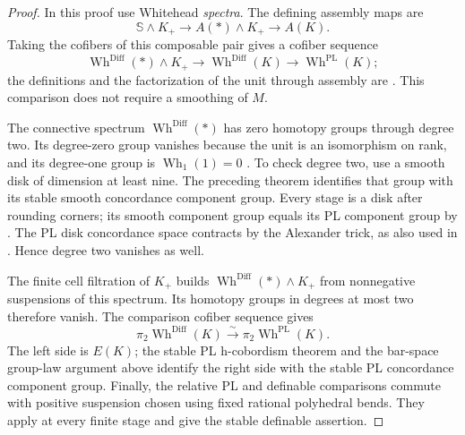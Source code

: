 \begin{proof}
In this proof use Whitehead \emph{spectra}.  The defining assembly
maps are
\[
 \mathbb S\wedge K_+\longrightarrow A(*)\wedge K_+
                \longrightarrow A(K).
\]
Taking the cofibers of this composable pair gives a cofiber sequence
\[
 \operatorname{Wh}^{\mathrm{Diff}}(*)\wedge K_+
 \longrightarrow\operatorname{Wh}^{\mathrm{Diff}}(K)
 \longrightarrow\operatorname{Wh}^{\mathrm{PL}}(K);
\]
the definitions and the factorization of the unit through assembly
are \cite[Definitions~1.3.2 and~1.3.4, pp.~16--18]
{WaldhausenJahrenRognes2013}.  This comparison does not require a
smoothing of $M$.

The connective spectrum $\operatorname{Wh}^{\mathrm{Diff}}(*)$
has zero homotopy groups through degree two.  Its degree-zero group
vanishes because the unit is an isomorphism on rank, and its
degree-one group is $\operatorname{Wh}_1(1)=0$
\cite[Theorem~0.3 and the following paragraph, p.~4]
{WaldhausenJahrenRognes2013}.  To check degree two, use a smooth
disk of dimension at least nine.  The preceding theorem identifies
that group with its stable smooth concordance component group.
Every stage is a disk after rounding corners; its smooth component
group equals its PL component group by
\cite[Theorem~6.1, pp.~41--43]{BurgheleaLashof1974II}.
The PL disk concordance space contracts by the Alexander trick,
as also used in
\cite[proof of Corollary~1.4.2, p.~23]
{WaldhausenJahrenRognes2013}.  Hence degree two vanishes as well.

The finite cell filtration of $K_+$ builds
$\operatorname{Wh}^{\mathrm{Diff}}(*)\wedge K_+$ from
nonnegative suspensions of this spectrum.  Its homotopy groups in
degrees at most two therefore vanish.  The comparison cofiber
sequence gives
\[
 \pi_2\operatorname{Wh}^{\mathrm{Diff}}(K)
       \xrightarrow{\sim}
 \pi_2\operatorname{Wh}^{\mathrm{PL}}(K).
\]
The left side is $E(K)$; the stable PL h-cobordism theorem and the
bar-space group-law argument above identify the right side with the
stable PL concordance component group.  Finally, the relative PL and
definable comparisons commute with positive suspension chosen using
fixed rational polyhedral bends.  They apply at every finite stage
and give the stable definable assertion.
\end{proof}

